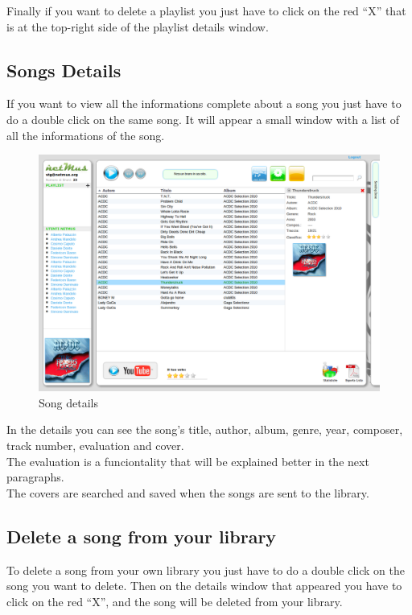 Finally if you want to delete a playlist you just have to click on the red ``X''
that is at the top-right side of the playlist details window.

\subsection*{Songs Details}

If you want to view all the informations complete about a song you just have to
do a double click on the same song. It will appear a small window with a list of
all the informations of the song.\\
\begin{figure}[htbp]
  \centering
  \includegraphics[width=15cm]{img/MU/info_song.png}
\caption{Song details}
\end{figure}

In the details you can see the song's title, author, album, genre, year,
composer, track number, evaluation and cover.\\
The evaluation is a funciontality that will be explained better in the next
paragraphs.\\
The covers are searched and saved when the songs are sent to the library.

\subsection*{Delete a song from your library}

To delete a song from your own library you just have to do a double click on the
song you want to delete. Then on the details window that appeared you have to
click on the red ``X'', and the song will be deleted from your library.

